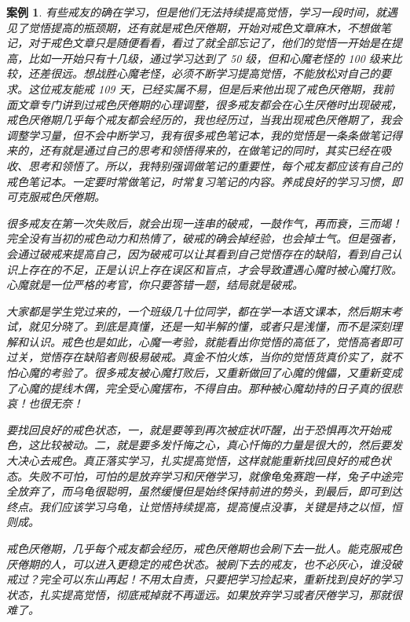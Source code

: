 \documentclass{ctexart}
\newtheorem{case}{案例}
\begin{document}
\begin{case}
    有些戒友的确在学习，但是他们无法持续提高觉悟，学习一段时间，就遇见了觉悟提高的瓶颈期，还有就是戒色厌倦期，开始对戒色文章麻木，不想做笔记，对于戒色文章只是随便看看，看过了就全部忘记了，他们的觉悟一开始是在提高，比如一开始只有十几级，通过学习达到了 50 级，但和心魔老怪的 100 级来比较，还差很远。想战胜心魔老怪，必须不断学习提高觉悟，不能放松对自己的要求。这位戒友能戒 109 天，已经实属不易，但是后来他出现了戒色厌倦期，我前面文章专门讲到过戒色厌倦期的心理调整，很多戒友都会在心生厌倦时出现破戒，戒色厌倦期几乎每个戒友都会经历的，我也经历过，当我出现戒色厌倦期了，我会调整学习量，但不会中断学习，我有很多戒色笔记本，我的觉悟是一条条做笔记得来的，还有就是通过自己的思考和领悟得来的，在做笔记的同时，其实已经在吸收、思考和领悟了。所以，我特别强调做笔记的重要性，每个戒友都应该有自己的戒色笔记本。一定要时常做笔记，时常复习笔记的内容。养成良好的学习习惯，即可克服戒色厌倦期。

    很多戒友在第一次失败后，就会出现一连串的破戒，一鼓作气，再而衰，三而竭！完全没有当初的戒色动力和热情了，破戒的确会掉经验，也会掉士气。但是强者，会通过破戒来提高自己，因为破戒可以让其看到自己觉悟存在的缺陷，看到自己认识上存在的不足，正是认识上存在误区和盲点，才会导致遭遇心魔时被心魔打败。心魔就是一位严格的考官，你只要答错一题，结局就是破戒。

    大家都是学生党过来的，一个班级几十位同学，都在学一本语文课本，然后期末考试，就见分晓了。到底是真懂，还是一知半解的懂，或者只是浅懂，而不是深刻理解和认识。戒色也是如此，心魔一考验，就能看出你觉悟的高低了，觉悟高者即可过关，觉悟存在缺陷者则极易破戒。真金不怕火炼，当你的觉悟货真价实了，就不怕心魔的考验了。很多戒友被心魔打败后，又重新做回了心魔的傀儡，又重新变成了心魔的提线木偶，完全受心魔摆布，不得自由。那种被心魔劫持的日子真的很悲哀！也很无奈！

    要找回良好的戒色状态，一，就是要等到再次被症状吓醒，出于恐惧再次开始戒色，这比较被动。二，就是要多发忏悔之心，真心忏悔的力量是很大的，然后要发大决心去戒色。真正落实学习，扎实提高觉悟，这样就能重新找回良好的戒色状态。失败不可怕，可怕的是放弃学习和厌倦学习，就像龟兔赛跑一样，兔子中途完全放弃了，而乌龟很聪明，虽然缓慢但是始终保持前进的势头，到最后，即可到达终点。我们应该学习乌龟，让觉悟持续提高，提高慢点没事，关键是持之以恒，恒则成。

    戒色厌倦期，几乎每个戒友都会经历，戒色厌倦期也会刷下去一批人。能克服戒色厌倦期的人，可以进入更稳定的戒色状态。被刷下去的戒友，也不必灰心，谁没破戒过？完全可以东山再起！不用太自责，只要把学习捡起来，重新找到良好的学习状态，扎实提高觉悟，彻底戒掉就不再遥远。如果放弃学习或者厌倦学习，那就很难了。


\end{case}
\end{document}

